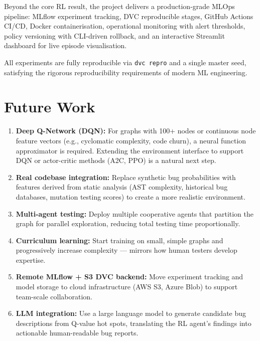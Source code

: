\documentclass[12pt,a4paper]{report}
\begin{document}
Beyond the core RL result, the project delivers a production-grade
MLOps pipeline: MLflow experiment tracking, DVC reproducible stages,
GitHub Actions CI/CD, Docker containerisation, operational monitoring
with alert thresholds, policy versioning with CLI-driven rollback, and
an interactive Streamlit dashboard for live episode visualisation.

All experiments are fully reproducible via \texttt{dvc repro} and a
single master seed, satisfying the rigorous reproducibility requirements
of modern ML engineering.

\section*{Future Work}

\begin{enumerate}[leftmargin=1.5em]
  \item \textbf{Deep Q-Network (DQN):} For graphs with 100+ nodes or
        continuous node feature vectors (e.g., cyclomatic complexity,
        code churn), a neural function approximator is required.
        Extending the environment interface to support DQN or actor-critic
        methods (A2C, PPO) is a natural next step.

  \item \textbf{Real codebase integration:} Replace synthetic bug
        probabilities with features derived from static analysis
        (AST complexity, historical bug databases, mutation testing
        scores) to create a more realistic environment.

  \item \textbf{Multi-agent testing:} Deploy multiple cooperative
        agents that partition the graph for parallel exploration,
        reducing total testing time proportionally.

  \item \textbf{Curriculum learning:} Start training on small, simple
        graphs and progressively increase complexity --- mirrors how
        human testers develop expertise.

  \item \textbf{Remote MLflow + S3 DVC backend:} Move experiment
        tracking and model storage to cloud infrastructure (AWS S3,
        Azure Blob) to support team-scale collaboration.

  \item \textbf{LLM integration:} Use a large language model to
        generate candidate bug descriptions from Q-value hot spots,
        translating the RL agent's findings into actionable human-readable
        bug reports.
\end{enumerate}
\end{document}
